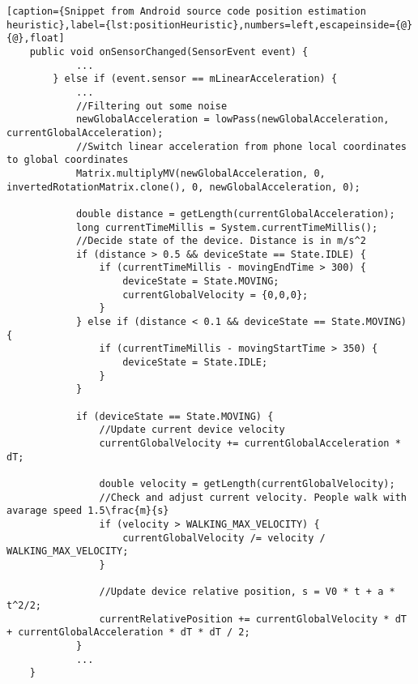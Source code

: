 \begin{lstlisting}[caption={Snippet from Android source code position estimation heuristic},label={lst:positionHeuristic},numbers=left,escapeinside={@}{@},float]
    public void onSensorChanged(SensorEvent event) {
            ...
        } else if (event.sensor == mLinearAcceleration) { 
            ...   
            //Filtering out some noise
            newGlobalAcceleration = lowPass(newGlobalAcceleration, currentGlobalAcceleration);
            //Switch linear acceleration from phone local coordinates to global coordinates
            Matrix.multiplyMV(newGlobalAcceleration, 0, invertedRotationMatrix.clone(), 0, newGlobalAcceleration, 0);

            double distance = getLength(currentGlobalAcceleration);
            long currentTimeMillis = System.currentTimeMillis();
            //Decide state of the device. Distance is in m/s^2
            if (distance > 0.5 && deviceState == State.IDLE) {
                if (currentTimeMillis - movingEndTime > 300) {
                    deviceState = State.MOVING;
                    currentGlobalVelocity = {0,0,0};
                }
            } else if (distance < 0.1 && deviceState == State.MOVING) {
                if (currentTimeMillis - movingStartTime > 350) {
                    deviceState = State.IDLE;
                }
            }

            if (deviceState == State.MOVING) {
                //Update current device velocity
                currentGlobalVelocity += currentGlobalAcceleration * dT;
                
                double velocity = getLength(currentGlobalVelocity);
                //Check and adjust current velocity. People walk with avarage speed 1.5\frac{m}{s}
                if (velocity > WALKING_MAX_VELOCITY) {
                    currentGlobalVelocity /= velocity / WALKING_MAX_VELOCITY;
                }
                
                //Update device relative position, s = V0 * t + a * t^2/2;
                currentRelativePosition += currentGlobalVelocity * dT + currentGlobalAcceleration * dT * dT / 2;                 
            }
            ...
    }   
\end{lstlisting}
